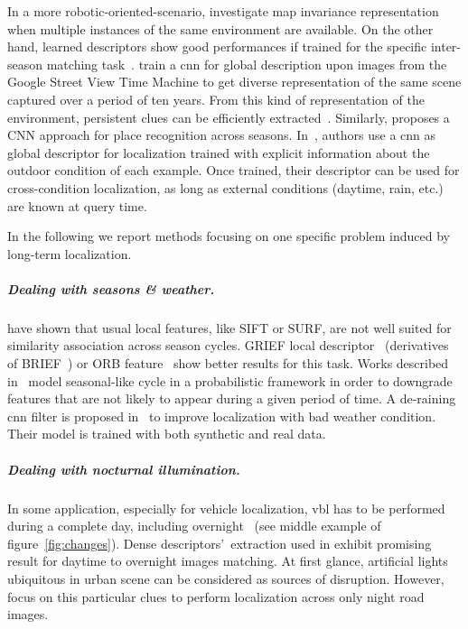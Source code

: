 			In a more robotic-oriented-scenario, \citet{Muhlfellner2015} investigate map invariance representation when multiple instances of the same environment are available. On the other hand, learned descriptors show good performances if trained for the specific inter-season matching task~\citep{Carlevaris-Bianco2014}. \citet{Arandjelovic2017} train a \ac{cnn} for global description upon images from the Google Street View Time Machine to get diverse representation of the same scene captured over a period of ten years. From this kind of representation of the environment, persistent clues can be efficiently extracted~\citep{Neubert2015}. Similarly, \citet{kumar2017condition} proposes a CNN approach for place recognition across seasons. In~\citet{Germain2018}, authors use a \ac{cnn} as global descriptor for localization trained with explicit information about the outdoor condition of each example. Once trained, their descriptor can be used for cross-condition localization, as long as external conditions (\eg daytime, rain, etc.) are known at query time.
			
			In the following we report methods focusing on one specific problem induced by long-term localization. 

			\subparagraph{Dealing with seasons \& weather.}
				\citet{Valgren2010} have shown that usual local features, like SIFT or SURF, are not well suited for similarity association across season cycles. GRIEF local descriptor~\citep{Krajnik2017a} (derivatives of BRIEF~\citep{Calonder2010}) or ORB feature~\citep{Griffith2017} show better results for this task. Works described in~\citep{Krajnik2014,Krajnik2017a} model seasonal-like cycle in a probabilistic framework in order to downgrade features that are not likely to appear during a given period of time. A de-raining \ac{cnn} filter is proposed in~\citep{Porav2019} to improve localization with bad weather condition. Their model is trained with both synthetic and real data.
		
			\subparagraph{Dealing with nocturnal illumination.}
				In some application, especially for vehicle localization, \ac{vbl} has to be performed during a complete day, including overnight~\citep{McManus2014,Milford2015} (see middle example of figure~\ref{fig:changes}). Dense descriptors'~extraction used in \citep{Torii2015} exhibit promising result for daytime to overnight images matching. At first glance, artificial lights ubiquitous in urban scene can be considered as sources of disruption. However, \citet{Nelson2015} focus on this particular clues to perform localization across only night road images. 
				

